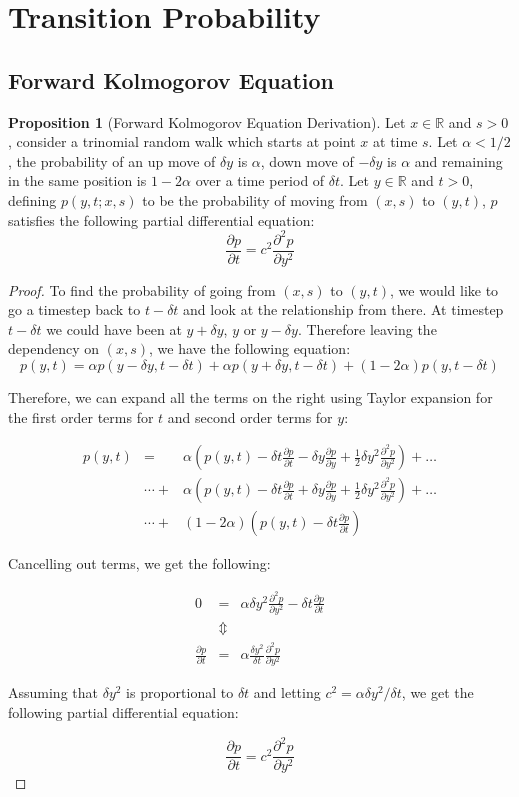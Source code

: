 \documentclass[11pt]{article}
\theoremstyle{definition}
\newtheorem{prop}{Proposition}[section]
\newcommand{\brac}[1]{\left(#1\right)}
\newcommand{\pardiff}[2]{\frac{\partial #1}{\partial #2}}
\newcommand{\R}{\mathbb{R}}
\newcommand{\dt}{\delta t}
\newcommand{\dy}{\delta y}
\begin{document}
\section{Transition Probability}

\subsection{Forward Kolmogorov Equation}
	\begin{prop}[Forward Kolmogorov Equation Derivation]
		Let $x\in\R$ and $s>0$, consider a trinomial random walk which starts at point $x$ at time $s$. Let $\alpha < 1/2$, the probability of an up move of $\dy$ is $\alpha$, down move of $-\dy$ is $\alpha$ and remaining in the same position is $1-2\alpha$ over a time period of $\dt$. Let $y\in\R$ and $t>0$, defining $p\brac{y,t;x,s}$ to be the probability of moving from $\brac{x,s}$ to $\brac{y,t}$, $p$ satisfies the following partial differential equation:
		\begin{equation}\label{forwardKolmogorovEqn}
			\pardiff{p}{t} = c^2 \pardiff{^2p}{y^2}
		\end{equation}
	\end{prop}
	\begin{proof}
		To find the probability of going from $\brac{x,s}$ to $\brac{y,t}$, we would like to go a timestep back to $t-\dt$ and look at the relationship from there. At timestep $t-\dt$ we could have been at $y+\dy$, $y$ or $y-\dy$. Therefore leaving the dependency on $\brac{x,s}$, we have the following equation:
		$$p\brac{y,t} = \alpha p \brac{y-\dy,t-\dt} + \alpha p\brac{y+\dy,t-\dt} + \brac{1-2\alpha}p\brac{y,t-\dt}$$
		
		Therefore, we can expand all the terms on the right using Taylor expansion for the first order terms for $t$ and second order terms for $y$:
		
		\begin{eqnarray*}
			p\brac{y,t} &=& \alpha \brac{p\brac{y,t}-\dt\pardiff{p}{t} - \dy\pardiff{p}{y} + \frac{1}{2}\dy^2\pardiff{^2p}{y^2}} + \dots\\
			&\cdots+ & \alpha \brac{p\brac{y,t}-\dt\pardiff{p}{t} + \dy\pardiff{p}{y} + \frac{1}{2}\dy^2\pardiff{^2p}{y^2}} + \dots\\
			&\cdots+ & \brac{1-2\alpha} \brac{p\brac{y,t}-\dt\pardiff{p}{t}}
		\end{eqnarray*}
		
		Cancelling out terms, we get the following:
		
		\begin{eqnarray*}
			0 &=& \alpha\dy^2\pardiff{^2p}{y^2} - \dt\pardiff{p}{t}\\
			&\Updownarrow&\\
			\pardiff{p}{t}&=& \alpha \frac{\dy^2}{\dt} \pardiff{^2p}{y^2}
		\end{eqnarray*}
		
		Assuming that $\dy^2$ is proportional to $\dt$ and letting $c^2 = \alpha \dy^2/\dt$, we get the following partial differential equation:
		
		$$\pardiff{p}{t}= c^2 \pardiff{^2p}{y^2}$$	
		
	\end{proof}
	
\end{document}
